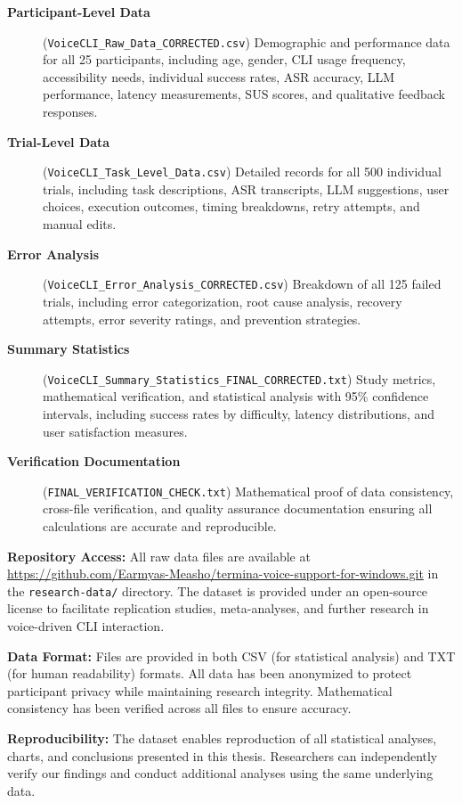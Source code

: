 \documentclass[a4paper,12pt]{article}
\begin{document}
\begin{description}
\item[\textbf{Participant-Level Data}] (\texttt{VoiceCLI\_Raw\_Data\_CORRECTED.csv})
Demographic and performance data for all 25 participants, including age, gender, CLI usage frequency, accessibility needs, individual success rates, ASR accuracy, LLM performance, latency measurements, SUS scores, and qualitative feedback responses.

\item[\textbf{Trial-Level Data}] (\texttt{VoiceCLI\_Task\_Level\_Data.csv})
Detailed records for all 500 individual trials, including task descriptions, ASR transcripts, LLM suggestions, user choices, execution outcomes, timing breakdowns, retry attempts, and manual edits.

\item[\textbf{Error Analysis}] (\texttt{VoiceCLI\_Error\_Analysis\_CORRECTED.csv})
Breakdown of all 125 failed trials, including error categorization, root cause analysis, recovery attempts, error severity ratings, and prevention strategies.

\item[\textbf{Summary Statistics}] (\texttt{VoiceCLI\_Summary\_Statistics\_FINAL\_CORRECTED.txt})
Study metrics, mathematical verification, and statistical analysis with 95\% confidence intervals, including success rates by difficulty, latency distributions, and user satisfaction measures.

\item[\textbf{Verification Documentation}] (\texttt{FINAL\_VERIFICATION\_CHECK.txt})
Mathematical proof of data consistency, cross-file verification, and quality assurance documentation ensuring all calculations are accurate and reproducible.
\end{description}

\textbf{Repository Access:} All raw data files are available at \url{https://github.com/Earmyas-Measho/termina-voice-support-for-windows.git} in the \texttt{research-data/} directory. The dataset is provided under an open-source license to facilitate replication studies, meta-analyses, and further research in voice-driven CLI interaction.

\textbf{Data Format:} Files are provided in both CSV (for statistical analysis) and TXT (for human readability) formats. All data has been anonymized to protect participant privacy while maintaining research integrity. Mathematical consistency has been verified across all files to ensure accuracy.

\textbf{Reproducibility:} The dataset enables reproduction of all statistical analyses, charts, and conclusions presented in this thesis. Researchers can independently verify our findings and conduct additional analyses using the same underlying data.
\end{document}
